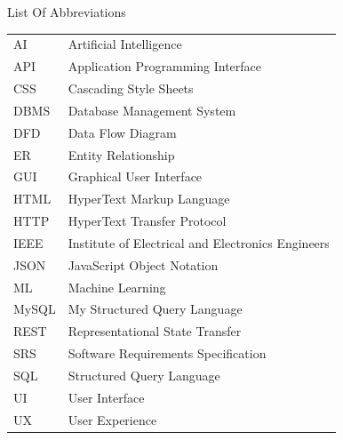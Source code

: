 \newpage
\begin{center}
    \vspace*{0.1cm}
    \Large
    {List Of Abbreviations}\\
    \vspace{0.5cm}
\end{center}

\begin{tabular}{ l l }
AI & Artificial Intelligence \\
API & Application Programming Interface \\
CSS & Cascading Style Sheets \\
DBMS & Database Management System \\
DFD & Data Flow Diagram \\
ER & Entity Relationship \\
GUI & Graphical User Interface \\
HTML & HyperText Markup Language \\
HTTP & HyperText Transfer Protocol \\
IEEE & Institute of Electrical and Electronics Engineers \\
JSON & JavaScript Object Notation \\
ML & Machine Learning \\
MySQL & My Structured Query Language \\
REST & Representational State Transfer \\
SRS & Software Requirements Specification \\
SQL & Structured Query Language \\
UI & User Interface \\
UX & User Experience \\
\end{tabular}
